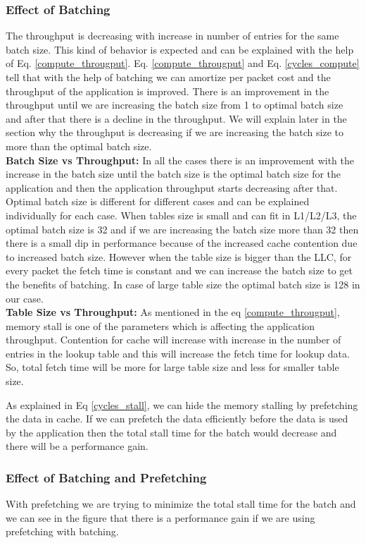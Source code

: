 \subsubsection{Effect of Batching}
\label{batchingsubsection}
The throughput is decreasing with increase in number of entries for the same batch size. This kind of behavior is expected and can be explained with the help of Eq. \ref{compute_througput}. Eq. \ref{compute_througput} and Eq. \ref{cycles_compute} tell that with the help of batching we can amortize per packet cost and the throughput of the application is improved. There is an improvement in the throughput until we are increasing the batch size from 1 to optimal batch size and after that there is a decline in the throughput. We will explain later in the section why the throughput is decreasing if we are increasing the batch size to more than the optimal batch size.  
\\
\textbf{Batch Size vs Throughput:} In all the cases there is an improvement with the increase in the batch size until the batch size is the optimal batch size for the application and then the application throughput starts decreasing after that. Optimal batch size is different for different cases and can be explained individually for each case. When tables size is small and can fit in L1/L2/L3, the optimal batch size is 32 and if we are increasing the batch size more than 32 then there is a small dip in performance because of the increased cache contention due to increased batch size. However when the table size is bigger than the LLC, for every packet the fetch time is constant and we can increase the batch size to get the benefits of batching. In case of large table size the optimal batch size is 128 in our case.
\\
\textbf{Table Size vs Throughput:} As mentioned in the eq \ref{compute_througput}, memory stall is one of the parameters which is affecting the application throughput. Contention for cache will increase with increase in the number of entries in the lookup table and this will increase the fetch time for lookup data. So, total fetch time will be more for large table size and less for smaller table size. 

As explained in Eq \ref{cycles_stall}, we can hide the memory stalling by prefetching the data in cache. If we can prefetch the data efficiently before the data is used by the application then the total stall time for the batch would decrease and there will be a performance gain.
\subsubsection{Effect of Batching and Prefetching}
\label{prefetchingsubsection}
With prefetching we are trying to minimize the total stall time for the batch and we can see in the figure that there is a performance gain if we are using prefetching with batching. 

